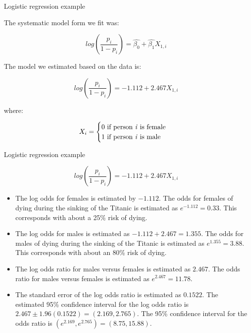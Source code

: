 \documentclass[ignorenonframetext,]{beamer}
\providecommand{\tightlist}{%
  \setlength{\itemsep}{0pt}\setlength{\parskip}{0pt}}
\begin{document}
\begin{frame}{Logistic regression example}

The systematic model form we fit was:

\[
log(\frac{p_i}{1 - p_i}) = \hat{\beta_0} + \hat{\beta_1}X_{1,i}
\]

The model we estimated based on the data is:

\[
log(\frac{p_i}{1 - p_i}) = -1.112 + 2.467X_{1,i}
\]

where:

\begin{equation*}
    X_i=
    \begin{cases}
      0 \text{ if person \textit{i} is female} \\
      1 \text{ if person \textit{i} is male}
    \end{cases}
\end{equation*}

\end{frame}

\begin{frame}{Logistic regression example}

\[
log(\frac{p_i}{1 - p_i}) = -1.112 + 2.467X_{1,i}
\] \small

\begin{itemize}
\tightlist
\item
  The log odds for females is estimated by \(-1.112\). The odds for
  females of dying during the sinking of the Titanic is estimated as
  \(e^{-1.112} = 0.33\). This corresponds with about a 25\% risk of
  dying.
\item
  The log odds for males is estimated as \(-1.112 + 2.467 = 1.355\). The
  odds for males of dying during the sinking of the Titanic is estimated
  as \(e^{1.355} = 3.88\). This corresponds with about an 80\% risk of
  dying.\\
\item
  The log odds ratio for males versus females is estimated as \(2.467\).
  The odds ratio for males versus females is estimated as
  \(e^{2.467} = 11.78\).
\item
  The standard error of the log odds ratio is estimated as \(0.1522\).
  The estimated 95\% confidence interval for the log odds ratio is
  \(2.467 \pm 1.96(0.1522) = (2.169, 2.765)\). The 95\% confidence
  interval for the odds ratio is
  \((e^{2.169}, e^{2.765}) = (8.75, 15.88)\).
\end{itemize}

\end{frame}
\end{document}
